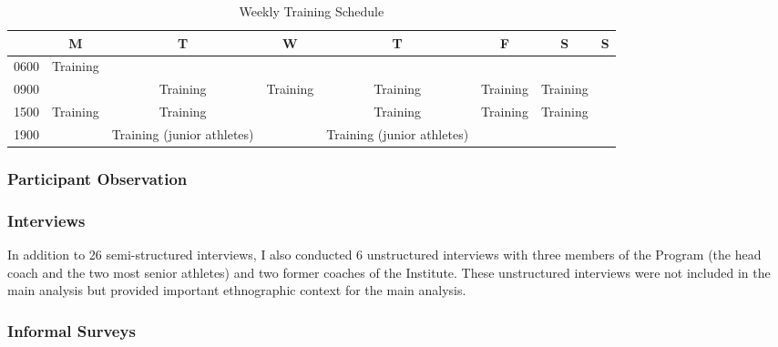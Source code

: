     \begin{landscape}
      \begin{table}[htpb]\caption{Weekly Training Schedule}
        \begin{center}
          \begin{small}
              \begin{tabular}{| c | c | c | c | c | c | c | c |}
                \hline
                & \bf M & \bf T & \bf W & \bf T & \bf F & \bf S & \bf S \\
                \hline
                0600 & Training &  &  & & & & \\
                \hline
                0900 &  & Training & Training & Training & Training & Training &  \\
                  \hline
                1500 & Training & Training & & Training & Training & Training &  \\
                  \hline
                1900 &  & Training (junior athletes) & & Training (junior athletes) & & & \\
                   \hline
              \end{tabular}
                  \label{tab:tournamentData}
            \end{small}
          \end{center}
        \end{table}
    \end{landscape}
    \restoregeometry




  \subsubsection{Participant Observation}

    \subsubsection{Interviews}

    In addition to 26 semi-structured interviews, I also conducted 6 unstructured interviews with three members of the Program (the head coach and the two most senior athletes) and two former coaches of the Institute.  These unstructured interviews were not included in the main analysis but provided important ethnographic context for the main analysis.

    \subsubsection{Informal Surveys}

